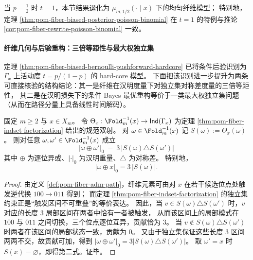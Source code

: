 \begin{remark}[与均匀纤维模型的一致性]\label{rem:pom-fiber-biased-specializes-uniform}
当 \(p=\frac12\) 时 \(t=1\)，本节结果退化为
\(
\mu_{m,1/2}(\cdot\mid x)
\)
下的均匀纤维模型；
特别地，定理 \ref{thm:pom-fiber-biased-posterior-poisson-binomial} 在 \(t=1\) 的特例与推论 \ref{cor:pom-fiber-rewrite-poisson-binomial} 一致。
\end{remark}

\paragraph{纤维几何与后验重构：三倍等距性与最大权独立集}
定理 \ref{thm:pom-fiber-biased-bernoulli-pushforward-hardcore} 已将条件后验识别为 \(\Gamma_x\) 上活动度 \(t=p/(1-p)\) 的 hard-core 模型。
下面把该识别进一步提升为两条可直接核验的结构结论：其一是纤维在汉明度量下对独立集对称差度量的三倍等距性，
其二是在汉明损失下的条件 Bayes 最优重构等价于一类最大权独立集问题（从而在路径分量上具备线性时间解码）。

\begin{proposition}[纤维汉明度量的三倍等距性]\label{prop:pom-fiber-hamming-triple-isometry}
固定 \(m\ge 2\) 与 \(x\in X_m\)。
令 \(\Theta_x:\Fold_m^{-1}(x)\to \mathsf{Ind}(\Gamma_x)\) 为定理 \ref{thm:pom-fiber-indset-factorization} 给出的规范双射。
对 \(\omega\in\Fold_m^{-1}(x)\) 记 \(S(\omega):=\Theta_x(\omega)\)。
则对任意 \(\omega,\omega'\in\Fold_m^{-1}(x)\) 成立
\[
\boxed{\;
|\omega\oplus\omega'|_0\ =\ 3\,\bigl|S(\omega)\triangle S(\omega')\bigr|\;}
\]
其中 \(\oplus\) 为逐位异或、\(|\cdot|_0\) 为汉明重量、\(\triangle\) 为对称差。
特别地，
\[
|\omega\oplus x|_0=3\,|S(\omega)|.
\]
\end{proposition}
\begin{proof}
由定义 \ref{def:pom-fiber-adm-path}，纤维元素可由对 \(x\) 在若干候选位点处触发逆代换 \(100\mapsto 011\) 得到；
而定理 \ref{thm:pom-fiber-indset-factorization} 的独立集约束正是“触发区间不可重叠”的等价表达。
因此，当 \(v\in S(\omega)\triangle S(\omega')\) 时，\(v\) 对应的长度 \(3\) 局部区间在两者中恰有一者被触发，
从而该区间上的局部模式在 \(100\) 与 \(011\) 之间切换，三个位点逐位互异，贡献恰为 \(3\)。
当 \(v\notin S(\omega)\triangle S(\omega')\) 时两者在该区间的局部状态一致，贡献为 \(0\)。
又由于独立集保证这些长度 \(3\) 区间两两不交，故贡献可加，得到
\(
|\omega\oplus\omega'|_0=3|S(\omega)\triangle S(\omega')|
\)。
取 \(\omega'=x\) 时 \(S(x)=\varnothing\)，即得第二式。证毕。
\end{proof}

